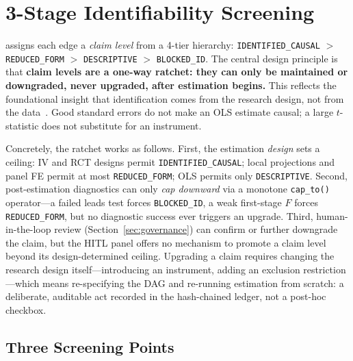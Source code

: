 \documentclass{article}
\begin{document}
\section{3-Stage Identifiability Screening}
\label{sec:identification}

\oc{} assigns each edge a \emph{claim level} from a 4-tier hierarchy: \texttt{IDENTIFIED\_CAUSAL} $>$ \texttt{REDUCED\_FORM} $>$ \texttt{DESCRIPTIVE} $>$ \texttt{BLOCKED\_ID}. The central design principle is that \textbf{claim levels are a one-way ratchet: they can only be maintained or downgraded, never upgraded, after estimation begins.} This reflects the foundational insight that identification comes from the research design, not from the data~\citep{angrist2010credibility}. Good standard errors do not make an OLS estimate causal; a large $t$-statistic does not substitute for an instrument.

Concretely, the ratchet works as follows. First, the estimation \emph{design} sets a ceiling: IV and RCT designs permit \texttt{IDENTIFIED\_CAUSAL}; local projections and panel FE permit at most \texttt{REDUCED\_FORM}; OLS permits only \texttt{DESCRIPTIVE}. Second, post-estimation diagnostics can only \emph{cap downward} via a monotone \texttt{cap\_to()} operator---a failed leads test forces \texttt{BLOCKED\_ID}, a weak first-stage $F$ forces \texttt{REDUCED\_FORM}, but no diagnostic success ever triggers an upgrade. Third, human-in-the-loop review (Section~\ref{sec:governance}) can confirm or further downgrade the claim, but the HITL panel offers no mechanism to promote a claim level beyond its design-determined ceiling. Upgrading a claim requires changing the research design itself---introducing an instrument, adding an exclusion restriction---which means re-specifying the DAG and re-running estimation from scratch: a deliberate, auditable act recorded in the hash-chained ledger, not a post-hoc checkbox.

\subsection{Three Screening Points}
\end{document}
